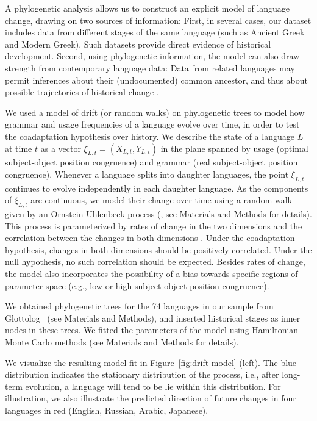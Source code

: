 \documentclass[9pt,twocolumn,twoside,lineno]{pnas-new}
\begin{document}
A phylogenetic analysis allows us to construct an explicit model of language change, drawing on two sources of information:
First, in several cases, our dataset includes data from different stages of the same language (such as Ancient Greek and Modern Greek).
Such datasets provide direct evidence of historical development.
Second, using phylogenetic information, the model can also draw strength from contemporary language data:
Data from related languages may permit inferences about their (undocumented) common ancestor, and thus about possible trajectories of historical change \citep{pagel2004bayesian, dunn-evolved-2011, maurits2014tracing}.


We used a model of drift (or random walks) on phylogenetic trees \citep{felsenstein1973maximum,pagel1997inferring, pagel2004bayesian} to model how grammar and usage frequencies of a language evolve over time, in order to test the coadaptation hypothesis over history.
We describe the state of a language $L$ at time $t$ as a vector $\xi_{L,t} = (X_{L,t}, Y_{L,t})$ in the plane spanned by usage (optimal subject-object position congruence) and grammar (real subject-object position congruence).
Whenever a language splits into daughter languages, the point $\xi_{L,t}$ continues to evolve independently in each daughter language.
As the components of $\xi_{L,t}$ are continuous, we model their change over time using a random walk given by an Ornstein-Uhlenbeck process (\citep{felsenstein1988phylogenies,hansen1997stabilizing, blackwell2003bayesian}, see Materials and Methods for details).
This process is parameterized by rates of change in the two dimensions and the correlation between the changes in both dimensions \citep{felsenstein1973maximum,hansen1997stabilizing, freckleton2012fast}.
Under the coadaptation hypothesis, changes in both dimensions should be positively correlated.
Under the null hypothesis, no such correlation should be expected.
Besides rates of change, the model also incorporates the possibility of a bias towards specific regions of parameter space (e.g., low or high subject-object position congruence).

We obtained phylogenetic trees for the 74 languages in our sample from Glottolog~\citep{nordhoff2011glottolog} (see Materials and Methods), and inserted historical stages as inner nodes in these trees.
We fitted the parameters of the model using Hamiltonian Monte Carlo methods (see Materials and Methods for details).



We visualize the resulting model fit in Figure~\ref{fig:drift-model} (left).
The blue distribution indicates the stationary distribution of the process, i.e., after long-term evolution, a language will tend to be lie within this distribution.
For illustration, we also illustrate the predicted direction of future changes in four languages in red (English, Russian, Arabic, Japanese).
\end{document}
